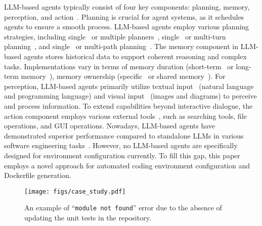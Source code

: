 LLM-based agents typically consist of four key components: planning, memory, perception, and action~\cite{components}. Planning is crucial for agent systems, as it schedules agents to ensure a smooth process. LLM-based agents employ various planning strategies, including single~\cite{plan1} or multiple planners~\cite{plan2}, single~\cite{plan3} or multi-turn planning~\cite{plan4}, and single~\cite{plan5} or multi-path planning~\cite{plan6}. The memory component in LLM-based agents stores historical data to support coherent reasoning and complex tasks. Implementations vary in terms of memory duration (short-term~\cite{memory1} or long-term memory~\cite{memory2}), memory ownership (specific~\cite{memory3} or shared memory~\cite{memory4}).
For perception, LLM-based agents primarily utilize textual input~\cite{perception1, memory2} (natural language and programming language) and visual input~\cite{perception3, perception4} (images and diagrams) to perceive and process information.
To extend capabilities beyond interactive dialogue, the action component employs various external tools~\cite{action1, action2}, such as searching tools, file operations, and GUI operations. 
Nowadays, LLM-based agents have demonstrated superior performance compared to standalone LLMs in various software engineering tasks~\cite{agent1, agent2, agent3}.
However, no LLM-based agents are specifically designed for environment configuration currently. To fill this gap, this paper employs a novel approach for automated coding environment configuration and Dockerfile generation. 


\begin{figure}[t]
	\centering
	\texttt{[image: figs/case\_study.pdf]}

    \caption{An example of ``\texttt{module not found}'' error due to the absence of updating the unit tests in the repository.}
\label{figs:case_study}

\end{figure}
% 
